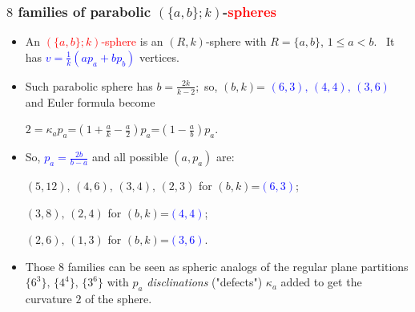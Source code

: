 \documentclass{beamer}
\begin{document}
\begin{frame}\frametitle{$8$ families of parabolic $(\{a,b\};k)$-\textcolor{red}{spheres}}



\begin{itemize}

\item An \textcolor{red}{$(\{a,b\};k)$-sphere} is an  $(R,k)$-sphere
with $R=\{a,b\}$, $1\le a < b$. $\,$ 
It has  \textcolor{blue}{$v$$=$$\frac{1}{k}(ap_a+bp_b)$} vertices.
\item 
Such parabolic sphere has $b=\frac{2k}{k-2}$;$\,$
 so, $(b,k)$=
\textcolor{blue}{$(6,3),\,(4,4),\,(3,6)$} 
and
Euler formula become

$2=\kappa_ap_a$=$(1+\frac{a}{k}-\frac{a}{2})p_a$=$(1-\frac{a}{b})p_a$.


\item So, \textcolor{blue}{$p_a=\frac{2b}{b-a}$}
and all possible
$(a,p_a)$ are:

 $(5,12),\, (4,6),\, (3,4),\, (2,3)$ for 
$(b,k)$=\textcolor{blue}{$(6,3)$};
         
$(3,8),\, (2,4)$ for $(b,k)$=\textcolor{blue}{$(4,4)$}; $\,\,$

$(2,6),\, (1,3)$ for $(b,k)$=\textcolor{blue}{$(3,6)$}.

\item Those $8$ families can be seen  as spheric analogs of the 
regular plane partitions $\{6^3\},\,\{4^4\},\,\{3^6\}$ with $p_a$ 
{\em disclinations} ("defects") $\kappa_a$   added to get the 
curvature $2$
of the sphere.


 \end{itemize}\end{frame}
\end{document}
